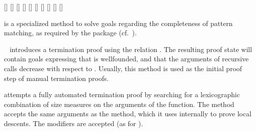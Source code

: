\begin{isabellebody}
\begin{isamarkuptext}
  \begin{railoutput}
[]
[]
\rail@end
{}
[]
\rail@plus
{}
[]
\rail@endplus
\rail@end
{}
[]
[]
\rail@plus
{}
[]
\rail@endplus
\rail@end
{}
\rail@plus
{}
\rail@bar
{}[]
[]
[]
\rail@endbar
\rail@endplus
\rail@end
\end{railoutput}


  \begin{description}

  \item \hyperlink{method.HOL.pat-completeness}{\mbox{}} is a specialized method to
  solve goals regarding the completeness of pattern matching, as
  required by the \hyperlink{command.HOL.function}{\mbox{}} package (cf.\
  \cite{isabelle-function}).

  \item \hyperlink{method.HOL.relation}{\mbox{}}~ introduces a termination
  proof using the relation .  The resulting proof state will
  contain goals expressing that  is wellfounded, and that the
  arguments of recursive calls decrease with respect to \isa{R}.
  Usually, this method is used as the initial proof step of manual
  termination proofs.

  \item \hyperlink{method.HOL.lexicographic-order}{\mbox{}} attempts a fully
  automated termination proof by searching for a lexicographic
  combination of size measures on the arguments of the function. The
  method accepts the same arguments as the \hyperlink{method.auto}{\mbox{}} method,
  which it uses internally to prove local descents.  The \hyperlink{syntax.clasimpmod}{\mbox{}} modifiers are accepted (as for \hyperlink{method.auto}{\mbox{}}).


\end{description}
\end{isamarkuptext}
\end{isabellebody}
